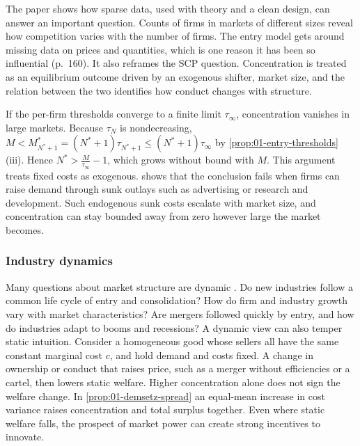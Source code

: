 The paper shows how sparse data, used with theory and a clean design, can answer an important question. Counts
of firms in markets of different sizes reveal how competition varies with the number of firms. The entry model
gets around missing data on prices and quantities, which is one reason it has been so influential (p.~160). It
also reframes the SCP question. Concentration is treated as an equilibrium outcome driven by an exogenous
shifter, market size, and the relation between the two identifies how conduct changes with structure.

\begin{remark}\label{rem:01-sutton}
If the per-firm thresholds converge to a finite limit $\tau_\infty$, concentration vanishes in large markets.
Because $\tau_N$ is nondecreasing, $M < M^*_{N^*+1} = (N^* + 1)\tau_{N^*+1} \le (N^* + 1)\tau_\infty$ by
\cref{prop:01-entry-thresholds}(iii). Hence $N^* > \frac{M}{\tau_\infty} - 1$, which grows without bound with
$M$. This argument treats fixed costs as exogenous. \citet{Sutton1991} shows that the conclusion fails when
firms can raise demand through sunk outlays such as advertising or research and development. Such
endogenous sunk costs escalate with market size, and concentration can stay bounded away from zero
however large the market becomes.
\end{remark}

\subsubsection{Industry dynamics}

Many questions about market structure are dynamic \citep[p.~156]{EinavLevin2010}. Do new industries follow a
common life cycle of entry and consolidation? How do firm and industry growth vary with market
characteristics? Are mergers followed quickly by entry, and how do industries adapt to booms and recessions?
A dynamic view can also temper static intuition. Consider a homogeneous good whose sellers all have the same
constant marginal cost $c$, and hold demand and costs fixed. A change in ownership or conduct that raises price,
such as a merger without efficiencies or a cartel, then lowers static welfare. Higher concentration
alone does not sign the welfare change. In \cref{prop:01-demsetz-spread} an equal-mean increase in cost variance raises concentration and
total surplus together. Even where static welfare falls, the prospect of market power can create strong incentives
to innovate.

